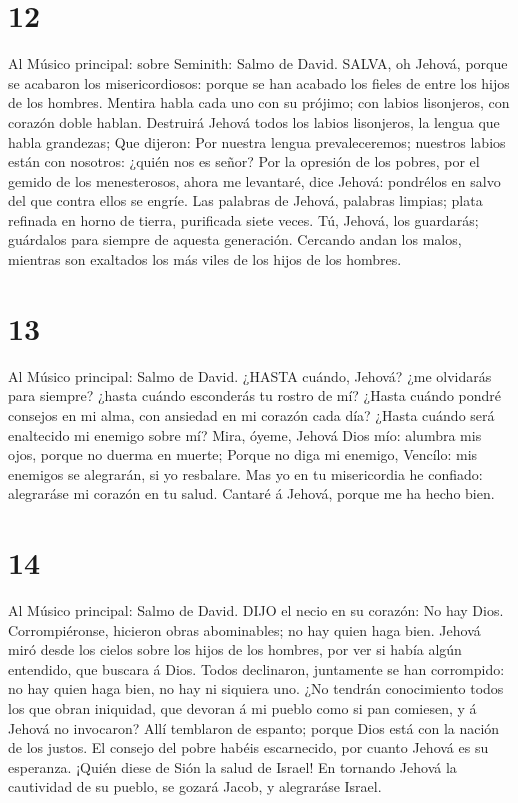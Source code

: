 \hypertarget{section-11}{%
\section{12}\label{section-11}}

 Al Músico principal: sobre Seminith: Salmo de David. SALVA,
oh Jehová, porque se acabaron los misericordiosos: porque se han acabado
los fieles de entre los hijos de los hombres.  Mentira habla
cada uno con su prójimo; con labios lisonjeros, con corazón doble
hablan.  Destruirá Jehová todos los labios lisonjeros, la
lengua que habla grandezas;  Que dijeron: Por nuestra lengua
prevaleceremos; nuestros labios están con nosotros: ¿quién nos es señor?
 Por la opresión de los pobres, por el gemido de los
menesterosos, ahora me levantaré, dice Jehová: pondrélos en salvo del
que contra ellos se engríe.  Las palabras de Jehová,
palabras limpias; plata refinada en horno de tierra, purificada siete
veces.  Tú, Jehová, los guardarás; guárdalos para siempre de
aquesta generación.  Cercando andan los malos, mientras son
exaltados los más viles de los hijos de los hombres.

\hypertarget{section-12}{%
\section{13}\label{section-12}}

 Al Músico principal: Salmo de David. ¿HASTA cuándo, Jehová?
¿me olvidarás para siempre? ¿hasta cuándo esconderás tu rostro de mí?
 ¿Hasta cuándo pondré consejos en mi alma, con ansiedad en
mi corazón cada día? ¿Hasta cuándo será enaltecido mi enemigo sobre mí?
 Mira, óyeme, Jehová Dios mío: alumbra mis ojos, porque no
duerma en muerte;  Porque no diga mi enemigo, Vencílo: mis
enemigos se alegrarán, si yo resbalare.  Mas yo en tu
misericordia he confiado: alegraráse mi corazón en tu salud.
 Cantaré á Jehová, porque me ha hecho bien.

\hypertarget{section-13}{%
\section{14}\label{section-13}}

 Al Músico principal: Salmo de David. DIJO el necio en su
corazón: No hay Dios. Corrompiéronse, hicieron obras abominables; no hay
quien haga bien.  Jehová miró desde los cielos sobre los
hijos de los hombres, por ver si había algún entendido, que buscara á
Dios.  Todos declinaron, juntamente se han corrompido: no
hay quien haga bien, no hay ni siquiera uno.  ¿No tendrán
conocimiento todos los que obran iniquidad, que devoran á mi pueblo como
si pan comiesen, y á Jehová no invocaron?  Allí temblaron de
espanto; porque Dios está con la nación de los justos.  El
consejo del pobre habéis escarnecido, por cuanto Jehová es su esperanza.
 ¡Quién diese de Sión la salud de Israel! En tornando Jehová
la cautividad de su pueblo, se gozará Jacob, y alegraráse Israel.

